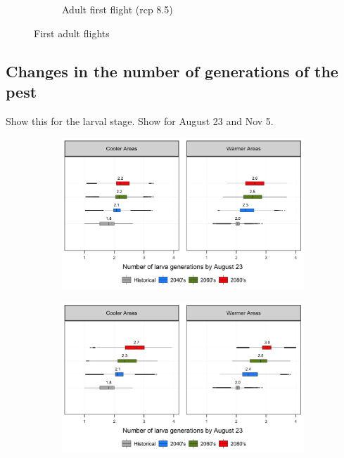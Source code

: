 \documentclass[12pt]{article}
\theoremstyle{plain}
\theoremstyle{definition}
\theoremstyle{definition}
\begin{document}
\begin{figure}[h!]
\begin{subfigure}[b]{0.5\textwidth}
        \caption{Adult first flight (rcp 8.5)}
        \label{fig:aff_85}
    \end{subfigure}
    \caption{First adult flights}\label{fig:First_adult_flights}
\end{figure}



\pagebreak

\subsection{Changes in the number of generations of the pest}
Show this for the larval stage. Show for August 23 and Nov 5.

\begin{figure}[h!]
    \centering
    \begin{subfigure}[b]{0.45\textwidth}
        \includegraphics[width=\textwidth]{figures/Larva_Gen_Aug_rcp45}
    \end{subfigure}
    \begin{subfigure}[b]{0.45\textwidth}
        \includegraphics[width=\textwidth]{figures/Larva_Gen_Aug_rcp85}

\end{subfigure}
\end{figure}
\end{document}
